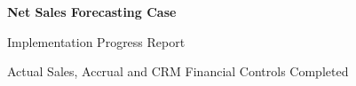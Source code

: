 \documentclass[11pt,a4paper]{article}
\begin{document}

{
    \Huge\bfseries\color{AaltoNavy}
    Net Sales Forecasting Case
    \par
}

\vspace{2mm}

{
    \Large\color{AaltoBlue}
    Implementation Progress Report
    \par
}

\vspace{2mm}

{
    \large\color{MediumGray}
    Actual Sales, Accrual and CRM Financial Controls Completed
    \par
}

\vspace{7mm}
\end{document}
